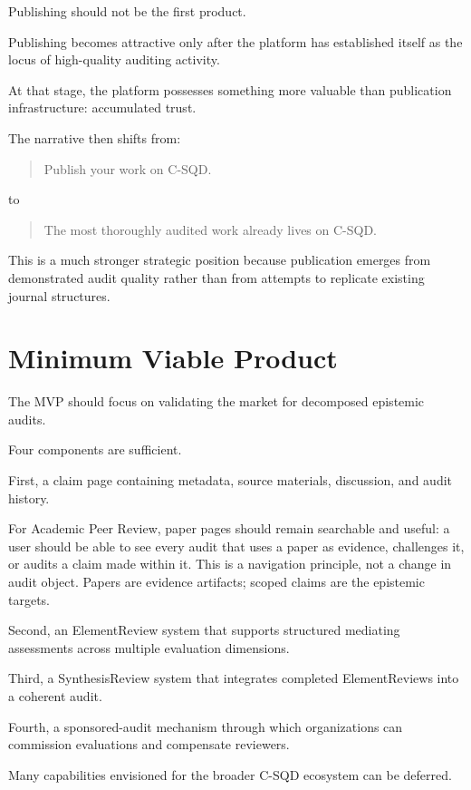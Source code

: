 \documentclass[11pt]{article}
\begin{document}
Publishing should not be the first product.

Publishing becomes attractive only after the platform has established itself as the locus of high-quality auditing activity.

At that stage, the platform possesses something more valuable than publication infrastructure: accumulated trust.

The narrative then shifts from:

\begin{quote}
Publish your work on C-SQD.
\end{quote}

to

\begin{quote}
The most thoroughly audited work already lives on C-SQD.
\end{quote}

This is a much stronger strategic position because publication emerges from demonstrated audit quality rather than from attempts to replicate existing journal structures.

\section{Minimum Viable Product}

The MVP should focus on validating the market for decomposed epistemic audits.

Four components are sufficient.

First, a claim page containing metadata, source materials, discussion, and audit history.

For Academic Peer Review, paper pages should remain searchable and useful: a user should be able to see every audit that uses a paper as evidence, challenges it, or audits a claim made within it. This is a navigation principle, not a change in audit object. Papers are evidence artifacts; scoped claims are the epistemic targets.

Second, an ElementReview system that supports structured mediating assessments across multiple evaluation dimensions.

Third, a SynthesisReview system that integrates completed ElementReviews into a coherent audit.

Fourth, a sponsored-audit mechanism through which organizations can commission evaluations and compensate reviewers.

Many capabilities envisioned for the broader C-SQD ecosystem can be deferred.
\end{document}

